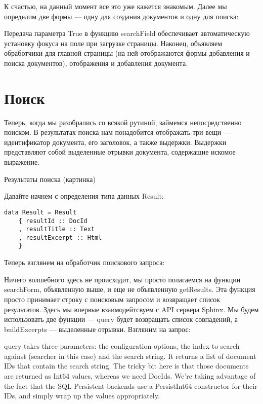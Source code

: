 

К счастью, на данный момент все это уже кажется знакомым. Далее мы определим две формы --- одну для создания документов и одну для поиска:



Передача параметра True в функцию searchField обеспечивает автоматическую установку фокуса на поле при загрузке страницы. Наконец, объявляем обработчики для главной страницы (на ней отображаются формы добавления и поиска документов), отображения и добавления документа.



\section{Поиск} %

Теперь, когда мы разобрались со всякой рутиной, займемся непосредственно поиском. В результатах поиска нам понадобится отображать три вещи --- идентификатор документа, его заголовок, а также выдержки. Выдержки представляют собой выделенные отрывки документа, содержащие искомое выражение.

Результаты поиска (картинка)

Давайте начнем с определения типа данных Result:

\begin{lstlisting}
data Result = Result
    { resultId :: DocId
    , resultTitle :: Text
    , resultExcerpt :: Html
    }
\end{lstlisting}

Теперь взглянем на обработчик поискового запроса:




Ничего волшебного здесь не происходит, мы просто полагаемся на функции searchForm, объявленную выше, и еще не объявленную getResults. Эта функция просто принимает строку с поисковым запросом и возвращает список результатов. Здесь мы впервые взаимодейтсвуем с API сервера Sphinx. Мы будем использовать две функции --- query будет возвращать список совпадений, а buildExcerpts --- выделенные отрывки. Взгляним на запрос: %



query takes three parameters: the configuration options, the index to search against (searcher in this case) and the search string. It returns a list of document IDs that contain the search string. The tricky bit here is that those documents are returned as Int64 values, whereas we need DocIds. We're taking advantage of the fact that the SQL Persistent backends use a PersistInt64 constructor for their IDs, and simply wrap up the values appropriately.

